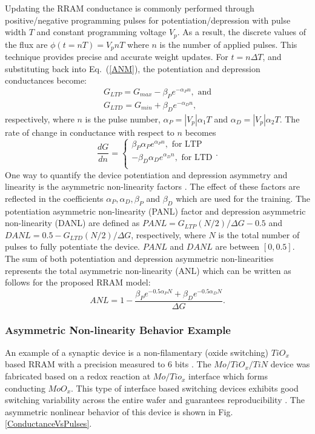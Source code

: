 \documentclass[english]{article}
\renewcommand{\refeq}[1]{{Eq.~(\ref{#1})}}
\renewcommand{\cite}{\citep}
\begin{document}
Updating the RRAM conductance is commonly performed through positive/negative programming pulses for potentiation/depression with pulse width $T$ and constant programming voltage $V_p$. 
As a result, the discrete values of the flux are $\phi(t=nT)=V_p n T$ where $n$ is the number of applied pulses. This technique provides precise and accurate weight updates. For $t=n\Delta T$, and substituting back into \refeq{ANM}, the potentiation and depression conductances become:
%
\begin{eqnarray}
G_{LTP}=G_{max}-\beta_P e^{-\alpha_P n},\,\, \text{and}\\
G_{LTD}=G_{min}+\beta_D e^{-\alpha_D n},
\end{eqnarray}
%
\noindent respectively, where $n$ is the pulse number, $\alpha_P=|V_p|\alpha_1 T$ and $\alpha_D=|V_p| \alpha_2T$. 
The rate of change in conductance with respect to $n$ becomes
\begin{equation}
\frac{dG}{dn}= \left\{ \begin{matrix}
\beta_P \alpha_P  e^{\alpha_P n} ,\text{ for LTP}\\
-\beta_D \alpha_D  e^{\alpha_D n} ,\text{ for LTD}\\
\end{matrix} .
\right.
\end{equation}
%
One way to quantify the device potentiation and depression asymmetry and linearity is the asymmetric non-linearity factors \cite{woo2018resistive}.
The effect of these factors are reflected in the coefficients $\alpha_P, \alpha_D, \beta_P$ and $\beta_D$ which are used for the training. 
The potentiation asymmetric non-linearity (PANL) factor and depression asymmetric non-linearity (DANL) are defined as
$PANL={G_{LTP}\left(N/2\right)}/{\Delta G}-0.5$ and $DANL=0.5-{G_{LTD}\left(N/2\right)}/{\Delta G}$, respectively, where $N$ is the total number of pulses to fully potentiate the device. $PANL$ and $DANL$ are between $[0, 0.5]$. The sum of both potentiation and depression asymmetric non-linearities represents the total asymmetric non-linearity (ANL) which can be written as follows for the proposed RRAM model:
\begin{equation}
ANL=1-\frac{\beta_P e^{-0.5\alpha_P N}+\beta_D e^{-0.5\alpha_D N}}{\Delta G}. 
\end{equation}

\subsubsection{Asymmetric Non-linearity Behavior Example}
An example of a synaptic device is a non-filamentary (oxide switching) ${TiO_x}$ based RRAM with a precision measured to 6 bits \cite{park2016tio}. The ${Mo/TiO_x/TiN}$ device was fabricated based on a redox reaction at ${Mo/Tio_x}$ interface which forms conducting ${MoO_x}$.
This type of interface based switching devices exhibits good switching variability across the entire wafer and guarantees reproducibility \cite{park2016tio}.
The asymmetric nonlinear behavior of this device is shown in Fig. \ref{ConductanceVsPulses}. 
\end{document}

